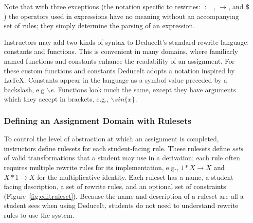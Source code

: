 \documentclass{sigchi}
\begin{document}
Note that with three exceptions (the notation specific to rewrites: $:=$, $\rightarrow$, and $\$$) the operators used in expressions have no meaning without an accompanying set of rules; they simply determine the parsing of an expression.

Instructors may add two kinds of syntax to DeduceIt's standard rewrite language: constants and functions. This is convenient in many domains, where familiarly named functions and constants enhance the readability of an assignment. For these custom functions and constants DeduceIt adopts a notation inspired by LaTeX. Constants appear in the language as a symbol value preceded by a backslash, e.g $\backslash{}e$. Functions look much the same, except they have arguments which they accept in brackets, e.g., $\backslash{}sin\{x\}$.

\subsubsection{Defining an Assignment Domain with Rulesets}

To control the level of abstraction at which an assignment is completed, instructors define rulesets for each student-facing rule. These rulesets define \textit{sets} of valid transformations that a student may use in a derivation; each rule often requires multiple rewrite rules for its implementation, e.g., $1*X \rightarrow X$ and $X*1 \rightarrow X$ for the multiplicative identity. Each ruleset has a name, a student-facing description, a set of rewrite rules, and an optional set of constraints (Figure~\ref{fig:editruleset}). Because the name and description of a ruleset are all a student sees when using DeduceIt, students do not need to understand rewrite rules to use the system.
\end{document}
